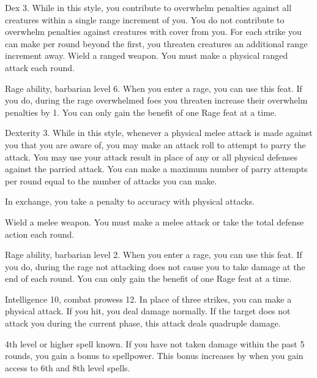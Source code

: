 \featpre Dex 3.
\featben While in this style, you contribute to overwhelm penalties against all creatures within a single range increment of you.
You do not contribute to overwhelm penalties against creatures with cover from you.
For each strike you can make per round beyond the first, you threaten creatures an additional range increment away.
\stylereq Wield a ranged weapon.
You must make a physical ranged attack each round.

\featpre Rage ability, barbarian level 6.
\featben When you enter a rage, you can use this feat. If you do, during the rage overwhelmed foes you threaten increase their overwhelm penalties by 1.
 You can only gain the benefit of one Rage feat at a time.

\featpre Dexterity 3.
\featben While in this style, whenever a physical melee attack is made against you that you are aware of, you may make an attack roll to attempt to parry the attack.
You may use your attack result in place of any or all physical defenses against the parried attack.
You can make a maximum number of parry attempts per round equal to the number of attacks you can make.

In exchange, you take a  penalty to accuracy with physical attacks.

\stylereq Wield a melee weapon.
You must make a melee attack or take the total defense action each round.

\featpre Rage ability, barbarian level 2.
\featben When you enter a rage, you can use this feat. If you do, during the rage not attacking does not cause you to take damage at the end of each round.
 You can only gain the benefit of one Rage feat at a time.

\featpre Intelligence 10, combat prowess 12.
\featben In place of three strikes, you can make a physical attack.
If you hit, you deal damage normally.
If the target does not attack you during the current phase, this attack deals quadruple damage.

\featpre 4th level or higher  spell known.
\featben If you have not taken damage within the past 5 rounds, you gain a  bonus to spellpower.
This bonus increases by  when you gain access to 6th and 8th level spells.

